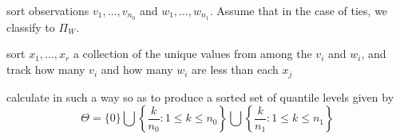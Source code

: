 \documentclass{article}
\begin{document}
\begin{algorithm}[p]
  \label{alg:empirically-optimal-classifier}
  \DontPrintSemicolon
  \BlankLine
  
  sort observations $v_1, \dots, v_{n_0}$ and $w_1, \dots, w_{n_1}$.  Assume
  that in the case of ties, we classify to $\Pi_W$. \;
  
  sort $x_1, \dots, x_r$ a collection of the unique values from among the $v_i$
  and $w_i$, and track how many $v_i$ and how many $w_i$ are less than each
  $x_j$ \;
  
  calculate in such a way so as to produce a sorted set of quantile levels given by
  \begin{equation*}
    \Theta = \Big\{ 0 \Big\} \bigcup
    \left\{ \frac{k}{n_0}: 1 \leq k \leq n_0 \right\} \bigcup
    \left\{ \frac{k}{n_1}: 1 \leq k \leq n_1 \right\}
  \end{equation*}

  \For{$i$ in 2 to $|\Theta|$}{
    
    \BlankLine
    
    calculate $\hat{F}_V^{-1}(\theta_i)$ and $\hat{F}_W^{-1}(\theta_i)$, and
    find
    \begin{equation*}
      a = \min \Big\{ \hat{F}_0^{-1}(\theta_i),~ \hat{F}_1^{-1}(\theta_i) \Big\}
      \hspace{5mm} \text{and} \hspace{5mm}
      b = \max \Big\{ \hat{F}_0^{-1}(\theta_i),~ \hat{F}_1^{-1}(\theta_i) \Big\}
    \end{equation*}

    calculate the interval
    \[
      G_i = \Big[
      \theta_i\, a + (1 - \theta_i)\, b,
      \hspace{3mm}
      \theta_{i-1}\, a + (1 - \theta_{i-1})\, b\,
      \Big) = \big[x_{\scriptscriptstyle\text{low}},\,
      x_{\scriptscriptstyle\text{high}}\big)
    \]

    find the smallest $x_i \in [x_{\scriptscriptstyle\text{low}}, \infty)$.  If
    $x_i \geq x_{\scriptscriptstyle\text{high}}$ then calculate the
    classification rate for $G_i$.

}
\end{algorithm}
\end{document}
